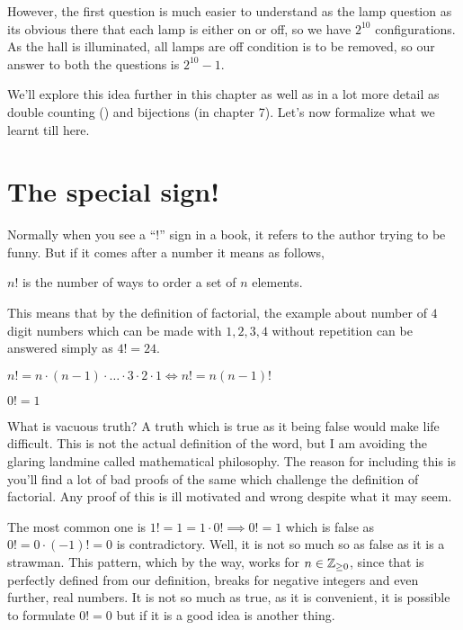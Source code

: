 However, the first question is much easier to understand as the lamp question as 
its obvious there that each lamp is either on or off, so we have \(2^{10}\) configurations. 
As the hall is illuminated, all lamps are off condition is to be removed, so our answer to 
both the questions is \(2^{10}-1\).

We'll explore this idea further in this chapter as well as in a lot more detail as 
double counting () and bijections (in chapter 7). Let's now formalize what we learnt till here.


\section{The special sign!}
Normally when you see a ``!'' sign in a book, it refers to the author trying to be funny. 
But if it comes after a number it means as follows,

\begin{definition}
    [Factorial]
    \(n!\) is the number of ways to order a set of \(n\) elements.
\end{definition}
This means that by the definition of factorial, the example about number of \(4\) digit numbers 
which can be made with \(1,2,3,4\) without repetition can be answered simply as \(4!=24\).

\begin{theorem}
    \(n! = n \cdot (n-1) \cdot \dots \cdot 3 \cdot 2 \cdot 1 \iff n != n(n-1)!\)
\end{theorem}

\begin{theorem}
    \(0!=1\)
\end{theorem}

What is vacuous truth? A truth which is true as it being false would make life difficult. 
This is not the actual definition of the word, but I am avoiding the glaring landmine called 
mathematical philosophy. The reason for including this is you'll find a lot of bad proofs of 
the same which challenge the definition of factorial. Any proof of this is ill motivated and 
wrong despite what it may seem.

The most common one is \(1!=1=1 \cdot 0! \implies 0!=1\) which is false as \(0! = 0 \cdot (-1) !=0 \) is contradictory.
Well, it is not so much so as false as it is a strawman. This pattern, which 
by the way, works for \(n \in \mathbb Z_{\ge 0}\), since that is perfectly defined from our definition, 
breaks for negative integers and even further, real numbers. It is not so much as true, 
as it is convenient, it is possible to formulate \(0! = 0\) but if it is a good idea is another 
thing.


